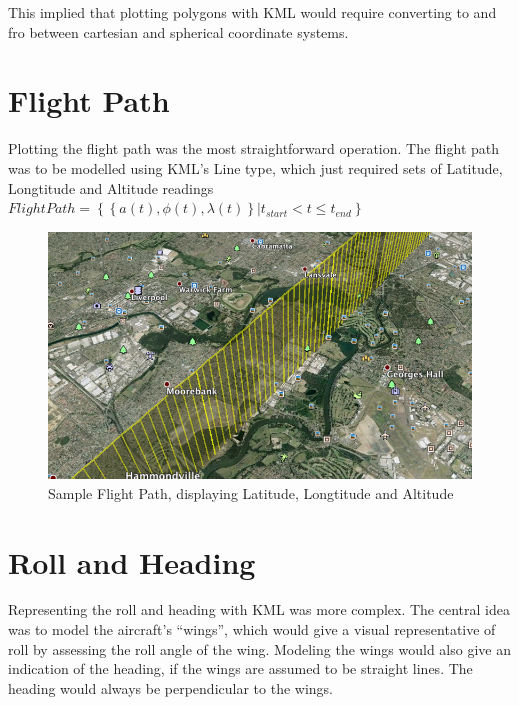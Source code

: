 This implied that plotting polygons with KML would require converting to and fro between cartesian and spherical coordinate systems.

\section{Flight Path}

Plotting the flight path was the most straightforward operation. The flight path was to be modelled using KML's Line type, which just required sets of Latitude, Longtitude and Altitude readings\\

$FlightPath = \left\{ \left\{a(t),\phi(t),\lambda(t) \right\} | t_{start} < t \leq t_{end} \right\}$ \\

\begin{figure}[h]
\caption{Sample Flight Path, displaying Latitude, Longtitude and Altitude}
\centering
  \includegraphics[scale=0.5]{gfx/flight-path-sample.png}
\end{figure}

\section{Roll and Heading}

Representing the roll and heading with KML was more complex. The central idea was to model the aircraft's ``wings'', which would give a visual representative of roll by assessing the roll angle of the wing. Modeling the wings would also give an indication of the heading, if the wings are assumed to be straight lines. The heading would always be perpendicular to the wings.\\


